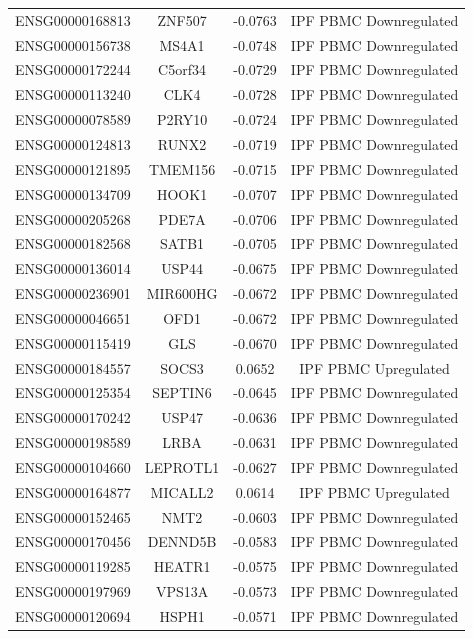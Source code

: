 \documentclass[
]{article}
\begin{document}
\begin{singlespace}
\begin{longtable}[t]{lccc}
ENSG00000168813 & ZNF507 & -0.0763 & IPF PBMC Downregulated\\
\addlinespace
ENSG00000156738 & MS4A1 & -0.0748 & IPF PBMC Downregulated\\
ENSG00000172244 & C5orf34 & -0.0729 & IPF PBMC Downregulated\\
ENSG00000113240 & CLK4 & -0.0728 & IPF PBMC Downregulated\\
ENSG00000078589 & P2RY10 & -0.0724 & IPF PBMC Downregulated\\
ENSG00000124813 & RUNX2 & -0.0719 & IPF PBMC Downregulated\\
\addlinespace
ENSG00000121895 & TMEM156 & -0.0715 & IPF PBMC Downregulated\\
ENSG00000134709 & HOOK1 & -0.0707 & IPF PBMC Downregulated\\
ENSG00000205268 & PDE7A & -0.0706 & IPF PBMC Downregulated\\
ENSG00000182568 & SATB1 & -0.0705 & IPF PBMC Downregulated\\
ENSG00000136014 & USP44 & -0.0675 & IPF PBMC Downregulated\\
\addlinespace
ENSG00000236901 & MIR600HG & -0.0672 & IPF PBMC Downregulated\\
ENSG00000046651 & OFD1 & -0.0672 & IPF PBMC Downregulated\\
ENSG00000115419 & GLS & -0.0670 & IPF PBMC Downregulated\\
ENSG00000184557 & SOCS3 & 0.0652 & IPF PBMC Upregulated\\
ENSG00000125354 & SEPTIN6 & -0.0645 & IPF PBMC Downregulated\\
\addlinespace
ENSG00000170242 & USP47 & -0.0636 & IPF PBMC Downregulated\\
ENSG00000198589 & LRBA & -0.0631 & IPF PBMC Downregulated\\
ENSG00000104660 & LEPROTL1 & -0.0627 & IPF PBMC Downregulated\\
ENSG00000164877 & MICALL2 & 0.0614 & IPF PBMC Upregulated\\
ENSG00000152465 & NMT2 & -0.0603 & IPF PBMC Downregulated\\
\addlinespace
ENSG00000170456 & DENND5B & -0.0583 & IPF PBMC Downregulated\\
ENSG00000119285 & HEATR1 & -0.0575 & IPF PBMC Downregulated\\
ENSG00000197969 & VPS13A & -0.0573 & IPF PBMC Downregulated\\
ENSG00000120694 & HSPH1 & -0.0571 & IPF PBMC Downregulated\\

\end{longtable}
\end{singlespace}
\end{document}
